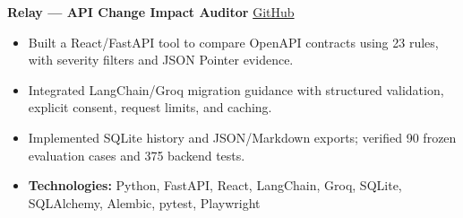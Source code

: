 \textbf{Relay --- API Change Impact Auditor} \hfill \href{https://github.com/AryamanAnand123/relay-api-change-auditor}{GitHub}
\begin{itemize}[noitemsep]
    \item Built a React/FastAPI tool to compare OpenAPI contracts using 23 rules, with severity filters and JSON Pointer evidence.
    \item Integrated LangChain/Groq migration guidance with structured validation, explicit consent, request limits, and caching.
    \item Implemented SQLite history and JSON/Markdown exports; verified 90 frozen evaluation cases and 375 backend tests.
    \item \textbf{Technologies:} Python, FastAPI, React, LangChain, Groq, SQLite, SQLAlchemy, Alembic, pytest, Playwright
\end{itemize}
